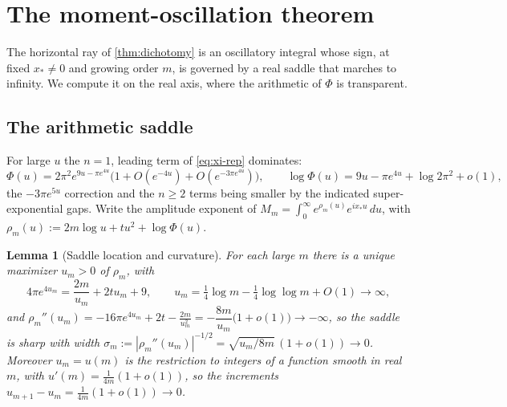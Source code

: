 \documentclass[11pt,reqno]{amsart}
\theoremstyle{plain}
\newtheorem{lemma}[theorem]{Lemma}
\theoremstyle{definition}
\theoremstyle{remark}
\begin{document}
\section{The moment-oscillation theorem}\label{sec:oscillation}

The horizontal ray of \cref{thm:dichotomy} is an oscillatory integral whose
sign, at fixed $x_*\neq0$ and growing order $m$, is governed by a real
saddle that marches to infinity. We compute it on the real axis, where the
arithmetic of $\Phi$ is transparent.

\subsection{The arithmetic saddle}
For large $u$ the $n=1$, leading term of \eqref{eq:xi-rep} dominates:
\begin{equation}\label{eq:Phitail}
  \Phi(u)=2\pi^2e^{9u-\pi e^{4u}}\bigl(1+O(e^{-4u})+O(e^{-3\pi e^{4u}})\bigr),
  \qquad
  \log\Phi(u)=9u-\pi e^{4u}+\log2\pi^2+o(1),
\end{equation}
the $-3\pi e^{5u}$ correction and the $n\ge2$ terms being smaller by the
indicated super-exponential gaps. Write the amplitude exponent of
$M_m=\int_0^\infty e^{\rho_m(u)}e^{ix_*u}\,du$, with
$\rho_m(u):=2m\log u+tu^2+\log\Phi(u)$.

\begin{lemma}[Saddle location and curvature]\label{lem:saddle}
For each large $m$ there is a unique maximizer $u_m>0$ of $\rho_m$, with
\begin{equation}\label{eq:saddle}
  4\pi e^{4u_m}=\frac{2m}{u_m}+2tu_m+9,
  \qquad
  u_m=\tfrac14\log m-\tfrac14\log\log m+O(1)\to\infty,
\end{equation}
and $\rho_m''(u_m)=-16\pi e^{4u_m}+2t-\tfrac{2m}{u_m^2}
=-\dfrac{8m}{u_m}\bigl(1+o(1)\bigr)\to-\infty$, so the saddle is sharp with
width $\sigma_m:=|\rho_m''(u_m)|^{-1/2}=\sqrt{u_m/8m}\,(1+o(1))\to0$.
Moreover $u_m=u(m)$ is the restriction to integers of a function smooth in
real $m$, with $u'(m)=\tfrac1{4m}(1+o(1))$, so the increments
$u_{m+1}-u_m=\tfrac1{4m}(1+o(1))\to0$.
\end{lemma}
\end{document}
